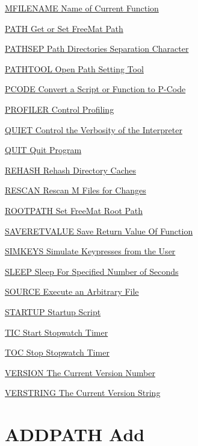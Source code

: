\begin{DoxyItemize}
\item \hyperlink{freemat_mfilename}{M\-F\-I\-L\-E\-N\-A\-M\-E Name of Current Function}  
\item \hyperlink{freemat_path}{P\-A\-T\-H Get or Set Free\-Mat Path}  
\item \hyperlink{freemat_pathsep}{P\-A\-T\-H\-S\-E\-P Path Directories Separation Character}  
\item \hyperlink{freemat_pathtool}{P\-A\-T\-H\-T\-O\-O\-L Open Path Setting Tool}  
\item \hyperlink{freemat_pcode}{P\-C\-O\-D\-E Convert a Script or Function to P-\/\-Code}  
\item \hyperlink{freemat_profiler}{P\-R\-O\-F\-I\-L\-E\-R Control Profiling}  
\item \hyperlink{freemat_quiet}{Q\-U\-I\-E\-T Control the Verbosity of the Interpreter}  
\item \hyperlink{freemat_quit}{Q\-U\-I\-T Quit Program}  
\item \hyperlink{freemat_rehash}{R\-E\-H\-A\-S\-H Rehash Directory Caches}  
\item \hyperlink{freemat_rescan}{R\-E\-S\-C\-A\-N Rescan M Files for Changes}  
\item \hyperlink{freemat_rootpath}{R\-O\-O\-T\-P\-A\-T\-H Set Free\-Mat Root Path}  
\item \hyperlink{freemat_saveretvalue}{S\-A\-V\-E\-R\-E\-T\-V\-A\-L\-U\-E Save Return Value Of Function}  
\item \hyperlink{freemat_simkeys}{S\-I\-M\-K\-E\-Y\-S Simulate Keypresses from the User}  
\item \hyperlink{freemat_sleep}{S\-L\-E\-E\-P Sleep For Specified Number of Seconds}  
\item \hyperlink{freemat_source}{S\-O\-U\-R\-C\-E Execute an Arbitrary File}  
\item \hyperlink{freemat_startup}{S\-T\-A\-R\-T\-U\-P Startup Script}  
\item \hyperlink{freemat_tic}{T\-I\-C Start Stopwatch Timer}  
\item \hyperlink{freemat_toc}{T\-O\-C Stop Stopwatch Timer}  
\item \hyperlink{freemat_version}{V\-E\-R\-S\-I\-O\-N The Current Version Number}  
\item \hyperlink{freemat_verstring}{V\-E\-R\-S\-T\-R\-I\-N\-G The Current Version String}  
\end{DoxyItemize}\hypertarget{freemat_addpath}{}\section{A\-D\-D\-P\-A\-T\-H Add}\label{freemat_addpath}

